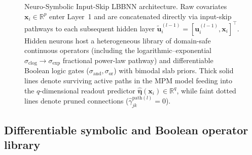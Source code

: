 \documentclass[11pt,a4paper]{article}
\begin{document}
\begin{figure}[t!]
{%
  }
  \caption{Neuro-Symbolic Input-Skip LBBNN architecture. Raw covariates $\bm{x}_i \in \mathbb{R}^p$ enter Layer~1 and are concatenated directly via input-skip pathways to each subsequent hidden layer $\tilde{\bm{u}}_i^{(l-1)} = [\bm{u}_i^{(l-1)}, \bm{x}_i]^\top$. Hidden neurons host a heterogeneous library of domain-safe continuous operators (including the logarithmic--exponential $\sigma_{\text{clog}} \to \sigma_{\exp}$ fractional power-law pathway) and differentiable Boolean logic gates ($\sigma_{\text{and}}, \sigma_{\text{or}}$) with bimodal slab priors. Thick solid lines denote surviving active paths in the MPM model feeding into the $q$-dimensional readout predictor $\hat{\bm{\eta}}(\bm{x}_i) \in \mathbb{R}^q$, while faint dotted lines denote pruned connections ($\hat{\gamma}_{jk}^{\text{path}(l)} = 0$).}
  \label{fig:architecture}
\end{figure}

\subsection{Differentiable symbolic and Boolean operator library}
\label{sec:methods:operators}
\end{document}
